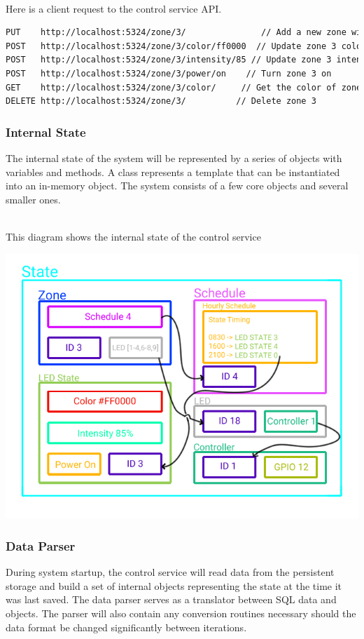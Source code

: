 \documentclass[onecolumn, draftclsnofoot,10pt, compsoc]{IEEEtran}
\begin{document}
			\noindent \\Here is a client request to the control service API.
			\begin{lstlisting}[language=XML]
PUT    http://localhost:5324/zone/3/               // Add a new zone with ID 3
POST   http://localhost:5324/zone/3/color/ff0000  // Update zone 3 color to red
POST   http://localhost:5324/zone/3/intensity/85 // Update zone 3 intensity to 85%
POST   http://localhost:5324/zone/3/power/on    // Turn zone 3 on
GET    http://localhost:5324/zone/3/color/     // Get the color of zone 3, returns ff0000 (red)
DELETE http://localhost:5324/zone/3/          // Delete zone 3
\end{lstlisting}

			\subsubsection{Internal State}
			The internal state of the system will be represented by a series of objects with variables and methods.
			A class represents a template that can be instantiated into an in-memory object.
			The system consists of a few core objects and several smaller ones.

			\noindent \\This diagram shows the internal state of the control service

			\begin{center}
			\includegraphics[width=\hsize]{systemDiagrams/state.png}
			\end{center}

			\subsubsection{Data Parser}
			During system startup, the control service will read data from the persistent storage and build a set of internal objects representing the state at the time it was last saved.
			The data parser serves as a translator between SQL data and objects.
			The parser will also contain any conversion routines necessary should the data format be changed significantly between iterations.
\end{document}
